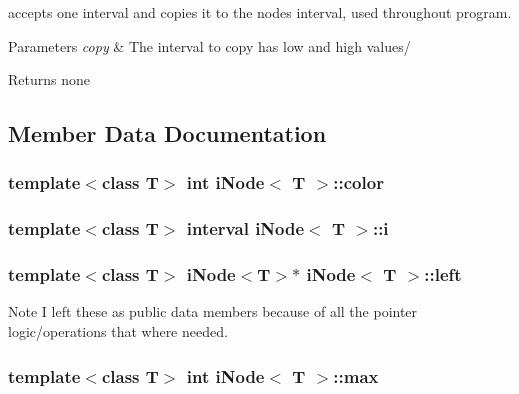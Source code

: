 accepts one interval and copies it to the nodes interval, used throughout program.


\begin{DoxyParams}{Parameters}
{\em copy} & The interval to copy has low and high values/ \\
\hline
\end{DoxyParams}
\begin{DoxyReturn}{Returns}
none 
\end{DoxyReturn}


\subsection{Member Data Documentation}
\hypertarget{classi_node_aa7ba0802d39c1bce4004f44f906f84a2}{
\subsubsection[{color}]{\setlength{\rightskip}{0pt plus 5cm}template$<$class T$>$ int {\bf i\-Node}$<$ T $>$\-::color}}\label{classi_node_aa7ba0802d39c1bce4004f44f906f84a2}
\hypertarget{classi_node_ad904f3d2430c5c0bce7f9bf840a4bad9}{
\subsubsection[{i}]{\setlength{\rightskip}{0pt plus 5cm}template$<$class T$>$ {\bf interval} {\bf i\-Node}$<$ T $>$\-::i}}\label{classi_node_ad904f3d2430c5c0bce7f9bf840a4bad9}
\hypertarget{classi_node_a7345e2239c8d643b56b5aa7193f6c85c}{
\subsubsection[{left}]{\setlength{\rightskip}{0pt plus 5cm}template$<$class T$>$ {\bf i\-Node}$<$T$>$$\ast$ {\bf i\-Node}$<$ T $>$\-::left}}\label{classi_node_a7345e2239c8d643b56b5aa7193f6c85c}
\begin{DoxyNote}{Note}
I left these as public data members because of all the pointer logic/operations that where needed. 
\end{DoxyNote}
\hypertarget{classi_node_adcb3b4ff4d6a266af36e930f494e10db}{
\subsubsection[{max}]{\setlength{\rightskip}{0pt plus 5cm}template$<$class T$>$ int {\bf i\-Node}$<$ T $>$\-::max}}\label{classi_node_adcb3b4ff4d6a266af36e930f494e10db}
